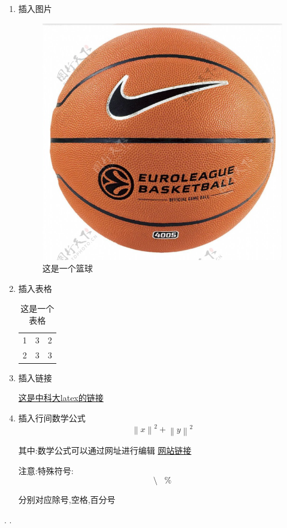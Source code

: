 \documentclass{article}
\begin{document}
\begin{enumerate}
    \item 插入图片   %
    \begin{figure}
        \centering
        \includegraphics[width=0.5\linewidth]{屏幕截图 161805.png}
        \caption{这是一个篮球}
        \label{fig:enter-label}
    \end{figure}

    \item 插入表格   %
    
    \begin{table}
        \centering
        \begin{tabular}{ccc}
            1 & 3 & 2\\
            2 & 3 & 3\\
        \end{tabular}
        \caption{这是一个表格}
        \label{tab:my_label}
    \end{table}

    \item 插入链接
    
    \href{https://latex.ustc.edu.cn/}{这是中科大latex的链接}

    \item 插入行间数学公式
\[  
\left\|x\right\|^{2}+\left\|y\right\|^{2}
\]



其中:数学公式可以通过网址进行编辑
\href{https://www.latexlive.com/home}{网站链接}

注意:特殊符号:\[\setminus \hspace{10pt} \%\]

分别对应除号,空格,百分号

\end{enumerate}

\cite{li1975}
\cite{sharkovsky1964}
\cite{12345}.
\cite{67890}.


\printbibliography
\end{document}
